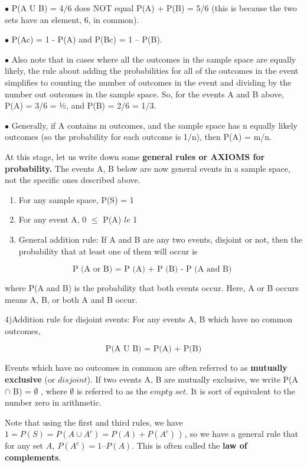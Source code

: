 \documentclass[
]{book}
\providecommand{\tightlist}{%
  \setlength{\itemsep}{0pt}\setlength{\parskip}{0pt}}
\begin{document}
\(\bullet\) P(A U B) = 4/6 does NOT equal P(A) + P(B) = 5/6 (this is because the two sets have an element, 6, in common).

\(\bullet\) P(Ac) = 1 - P(A) and P(Bc) = 1 -- P(B).

\(\bullet\) Also note that in cases where all the outcomes in the sample space are equally likely, the rule about adding the probabilities for all of the outcomes in the event simplifies to counting the number of outcomes in the event and dividing by the number out outcomes in the sample space. So, for the events A and B above, P(A) = 3/6 = 1⁄2, and P(B) = 2/6 = 1/3.

\(\bullet\) Generally, if A contains m outcomes, and the sample space has n equally likely outcomes (so the probability for each outcome is 1/n), then P(A) = m/n.

At this stage, let us write down some \textbf{general rules or AXIOMS for probability.} The events A, B below are now general events in a sample space, not the specific ones described above.

\begin{enumerate}
\def\labelenumi{\arabic{enumi})}
\tightlist
\item
  For any sample space, P(S) = 1
\item
  For any event A, 0 \(\le\) P(A) \(le\) 1
\item
  General addition rule: If A and B are any two events, disjoint or not, then the probability that at least one of them will occur is
\end{enumerate}

\[
\text{P (A or B) = P (A) + P (B) - P (A and B) }
\]

where P(A and B) is the probability that both events occur. Here, A or B occurs means A, B, or both A and B occur.

4)Addition rule for disjoint events: For any events A, B which have no common outcomes,

\[
\text{P(A U B) = P(A) + P(B)}
\]

Events which have no outcomes in common are often referred to as \textbf{mutually exclusive} (or \(\textit{disjoint}\)). If two events A, B are mutually exclusive, we write P(A \(\cap\) B) = \(\emptyset\) , where \(\emptyset\) is referred to as the \(\textit{empty set}\). It is sort of equivalent to the number zero in arithmetic.

Note that using the first and third rules, we have \(1 = P(S) = P(A \cup A^c) = P(A) + P(A^c)\) ) , so we have a general rule that for any set \(A, \ P(A^c) = 1 – P(A)\). This is often called the \textbf{law of complements}.
\end{document}
